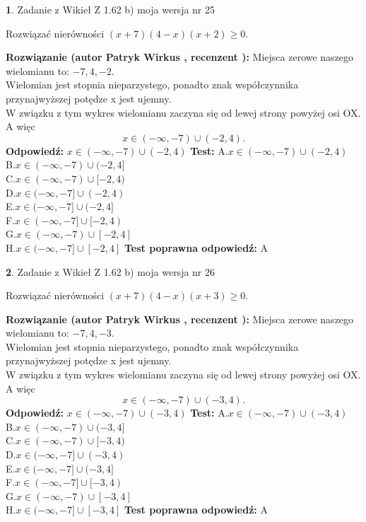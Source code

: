 \documentclass[12pt, a4paper]{article}
\theoremstyle{definition} %
\newtheorem{zad}{}
\newcommand{\zadStart}[1]{\begin{zad}#1\newline}
\newcommand{\zadStop}{\end{zad}}
\newcommand{\rozwStart}[2]{\noindent \textbf{Rozwiązanie (autor #1 , recenzent #2): }\newline}
\newcommand{\rozwStop}{\newline}
\newcommand{\odpStart}{\noindent \textbf{Odpowiedź:}\newline}
\newcommand{\odpStop}{\newline}
\newcommand{\testStart}{\noindent \textbf{Test:}\newline}
\newcommand{\testStop}{\newline}
\newcommand{\kluczStart}{\noindent \textbf{Test poprawna odpowiedź:}\newline}
\newcommand{\kluczStop}{\newline}
\begin{document}
\zadStart{Zadanie z Wikieł Z 1.62 b) moja wersja nr 25}

Rozwiązać nierówności $(x+7)(4-x)(x+2)\ge0$.
\zadStop
\rozwStart{Patryk Wirkus}{}
Miejsca zerowe naszego wielomianu to: $-7, 4, -2$.\\
Wielomian jest stopnia nieparzystego, ponadto znak współczynnika przy\linebreak najwyższej potędze x jest ujemny.\\ W związku z tym wykres wielomianu zaczyna się od lewej strony powyżej osi OX. A więc $$x \in (-\infty,-7) \cup (-2,4).$$
\rozwStop
\odpStart
$x \in (-\infty,-7) \cup (-2,4)$
\odpStop
\testStart
A.$x \in (-\infty,-7) \cup (-2,4)$\\
B.$x \in (-\infty,-7) \cup (-2,4]$\\
C.$x \in (-\infty,-7) \cup [-2,4)$\\
D.$x \in (-\infty,-7] \cup (-2,4)$\\
E.$x \in (-\infty,-7] \cup (-2,4]$\\
F.$x \in (-\infty,-7] \cup [-2,4)$\\
G.$x \in (-\infty,-7) \cup [-2,4]$\\
H.$x \in (-\infty,-7] \cup [-2,4]$
\testStop
\kluczStart
A
\kluczStop



\zadStart{Zadanie z Wikieł Z 1.62 b) moja wersja nr 26}

Rozwiązać nierówności $(x+7)(4-x)(x+3)\ge0$.
\zadStop
\rozwStart{Patryk Wirkus}{}
Miejsca zerowe naszego wielomianu to: $-7, 4, -3$.\\
Wielomian jest stopnia nieparzystego, ponadto znak współczynnika przy\linebreak najwyższej potędze x jest ujemny.\\ W związku z tym wykres wielomianu zaczyna się od lewej strony powyżej osi OX. A więc $$x \in (-\infty,-7) \cup (-3,4).$$
\rozwStop
\odpStart
$x \in (-\infty,-7) \cup (-3,4)$
\odpStop
\testStart
A.$x \in (-\infty,-7) \cup (-3,4)$\\
B.$x \in (-\infty,-7) \cup (-3,4]$\\
C.$x \in (-\infty,-7) \cup [-3,4)$\\
D.$x \in (-\infty,-7] \cup (-3,4)$\\
E.$x \in (-\infty,-7] \cup (-3,4]$\\
F.$x \in (-\infty,-7] \cup [-3,4)$\\
G.$x \in (-\infty,-7) \cup [-3,4]$\\
H.$x \in (-\infty,-7] \cup [-3,4]$
\testStop
\kluczStart
A
\kluczStop
\end{document}
